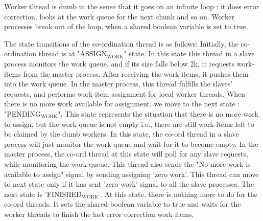 \documentclass[integrals, nointegrals, article, 12pt, a4paper]{article}
\begin{document}
Worker thread is dumb in the sense that it goes on an infinite loop : it
does error correction, looks at the work queue for the next chunk and so
on. Worker processes break out of the loop, when a shared boolean
variable is set to true.

The state transitions of the co-ordination thread is as follows:
Initially, the co-ordination thread is at "ASSIGN$_{\text{WORK}}$" state. In this
state this thread in a slave process monitors the work queue, and if its
size falls below 2k, it requests work-items from the master
process. After receiving the work items, it pushes them into the work
queue. In the master process, this thread fulfills the slaves' requests,
and performs work-item assignment for local worker threads. When there
is no more work available for assignment, we move to the next state :
"PENDING$_{\text{WORK}}$". This state represents the situation that there is no
more work to assign, but the work-queue is not empty i.e., there are
still work-items left to be claimed by the dumb workers. In this state,
the co-ord thread in a slave process will just monitor the work queue
and wait for it to become empty. In the master process, the co-ord
thread at this state will poll for any slave requests, while monitoring
the work queue. This thread also sends the "No more work is available to
assign" signal by sending assigning 'zero work'. This thread can move to
next state only if it has sent 'zero work' signal to all the slave
processes. The next state is 'FINISHED$_{\text{WORK'}}$. At this state, there is
nothing more to do for the co-ord threads. It sets the shared boolean
variable to true and waits for the worker threads to finish the last
error correction work items.
\end{document}
